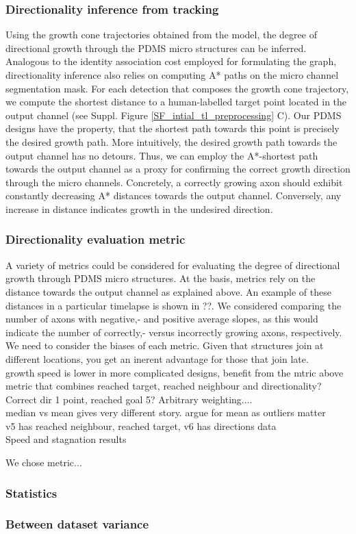 \subsubsection{Directionality inference from tracking}
Using the growth cone trajectories obtained from the model, the degree of
directional growth through the PDMS micro structures can be inferred. Analogous
to the identity association cost employed for formulating the graph,
directionality inference also relies on computing A* paths on the micro channel
segmentation mask. For each detection that composes the growth cone trajectory,
we compute the shortest distance to a human-labelled target point located in the
output channel (see Suppl. Figure \ref{SF_intial_tl_preprocessing} C). Our PDMS
designs have the property, that the shortest path towards this point is
precisely the desired growth path. More intuitively, the desired growth path
towards the output channel has no detours. Thus, we can employ the A*-shortest
path towards the output channel as a proxy for confirming the correct growth
direction through the micro channels. Concretely, a correctly growing axon
should exhibit constantly decreasing A* distances towards the output channel.
Conversely, any increase in distance indicates growth in the undesired
direction.

\subsubsection{Directionality evaluation metric}
A variety of metrics could be considered for evaluating the degree of
directional growth through PDMS micro structures. At the basis, metrics rely on
the distance towards the output channel as explained above. An example of these
distances in a particular timelapse is shown in ??.  We considered comparing the
number of axons with negative,- and positive average slopes, as this would
indicate the number of  correctly,- versus incorrectly growing axons,
respectively. \\

We need to consider the biases of each metric. Given that structures join at
different locations, you get an inerent advantage for those that join late. \\


growth speed is lower in more complicated designs, benefit from the mtric above \\


metric that combines reached target, reached neighbour and directionality? 
Correct dir 1 point, reached goal 5? Arbitrary weighting.... \\

median vs mean gives very different story. argue for mean as outliers matter \\

v5 has reached neighbour, reached target, v6 has directions data \\

Speed and stagnation results 

We chose metric...


\subsubsection{Statistics}

\subsubsection{Between dataset variance}